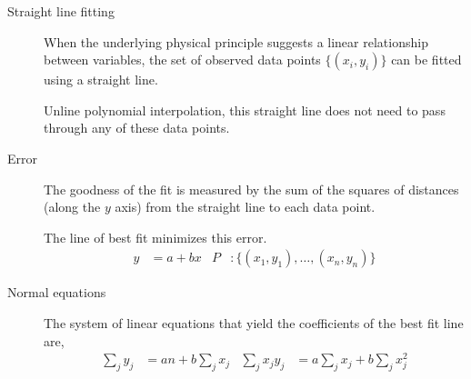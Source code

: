 \begin{description}
    \item[Straight line fitting] When the underlying physical principle suggests a
        linear relationship between variables, the set of observed data points
        $ \{(x_i, y_i)\} $ can be fitted using a straight line. \par
        Unline polynomial interpolation, this straight line does not need to pass through
        any of these data points.

    \item[Error] The goodness of the fit is measured by the sum of the squares of
        distances (along the $ y $ axis) from the straight line to each data point. \par
        The line of best fit minimizes this error.
        \begin{align}
            y & = a + bx                            &
            P & : \{(x_1, y_1), \dots, (x_n, y_n)\}
        \end{align}

    \item[Normal equations] The system of linear equations that yield the coefficients
        of the best fit line are,
        \begin{align}
            \sum_{j} y_j    & =  an + b\sum_{j} x_j            &
            \sum_{j} x_jy_j & = a\sum_{j}x_j + b\sum_{j} x^2_j
        \end{align}


\end{description}
